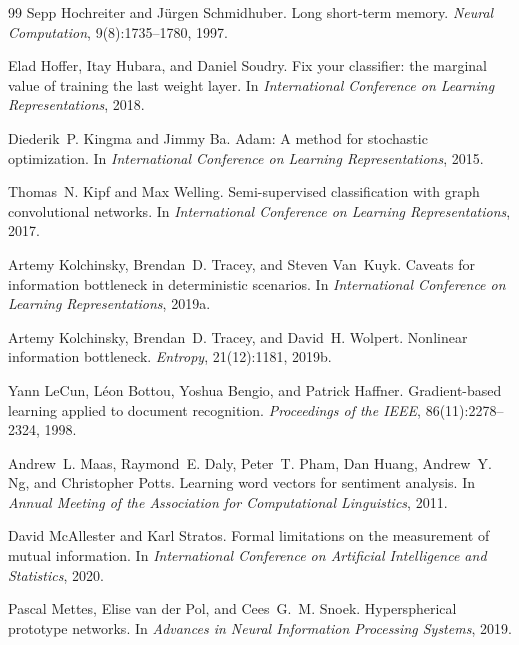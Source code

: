 \documentclass{article} %
\begin{document}
\begin{thebibliography}{99}
Sepp Hochreiter and J\"{u}rgen Schmidhuber.
\newblock Long short-term memory.
\newblock \emph{Neural Computation}, 9(8):1735--1780, 1997.

Elad Hoffer, Itay Hubara, and Daniel Soudry.
\newblock Fix your classifier: the marginal value of training the last weight layer.
\newblock In \emph{International Conference on Learning Representations}, 2018.

Diederik~P. Kingma and Jimmy Ba.
\newblock Adam: A method for stochastic optimization.
\newblock In \emph{International Conference on Learning Representations}, 2015.

Thomas~N. Kipf and Max Welling.
\newblock Semi-supervised classification with graph convolutional networks.
\newblock In \emph{International Conference on Learning Representations}, 2017.

Artemy Kolchinsky, Brendan~D. Tracey, and Steven Van~Kuyk.
\newblock Caveats for information bottleneck in deterministic scenarios.
\newblock In \emph{International Conference on Learning Representations}, 2019a.

Artemy Kolchinsky, Brendan~D. Tracey, and David~H. Wolpert.
\newblock Nonlinear information bottleneck.
\newblock \emph{Entropy}, 21(12):1181, 2019b.

Yann LeCun, L\'{e}on Bottou, Yoshua Bengio, and Patrick Haffner.
\newblock Gradient-based learning applied to document recognition.
\newblock \emph{Proceedings of the IEEE}, 86(11):2278--2324, 1998.

Andrew~L. Maas, Raymond~E. Daly, Peter~T. Pham, Dan Huang, Andrew~Y. Ng, and Christopher
  Potts.
\newblock Learning word vectors for sentiment analysis.
\newblock In \emph{Annual Meeting of the Association for Computational Linguistics}, 2011.

David McAllester and Karl Stratos.
\newblock Formal limitations on the measurement of mutual information.
\newblock In \emph{International Conference on Artificial Intelligence and Statistics},
  2020.

Pascal Mettes, Elise van der Pol, and Cees~G.~M. Snoek.
\newblock Hyperspherical prototype networks.
\newblock In \emph{Advances in Neural Information Processing Systems}, 2019.


\end{thebibliography}
\end{document}
